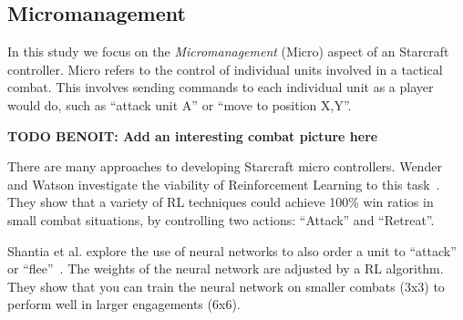 
\subsection{Micromanagement}

In this study we focus on the \emph{Micromanagement} (Micro) aspect of
an Starcraft controller. Micro refers to the control of individual
units involved in a tactical combat. This involves sending commands to
each individual unit as a player would do, such as ``attack unit A'' or
``move to position X,Y''. 

{\bf TODO BENOIT: Add an interesting combat picture here}

There are many approaches to developing Starcraft micro
controllers. Wender and Watson investigate the viability of
Reinforcement Learning to this task~\cite{Wender12ReinforcementMicroSC}. They show that a
variety of RL techniques could achieve 100\% win ratios in small
combat situations, by controlling two actions: ``Attack'' and
``Retreat''.

Shantia et al. explore the use of neural networks to also order a unit
to ``attack'' or ``flee''~\cite{Shantia11ConnectionistSC}. The weights of the neural
network are adjusted by a RL algorithm. They show that you can train
the neural network on smaller combats (3x3) to perform well in larger
engagements (6x6).

